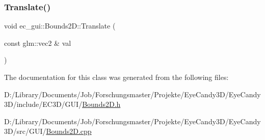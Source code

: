 \subsubsection{\texorpdfstring{Translate()}{Translate()}}
{\footnotesize\ttfamily void ec\+\_\+gui\+::\+Bounds2\+D\+::\+Translate (\begin{DoxyParamCaption}\item[{const glm\+::vec2 \&}]{val }\end{DoxyParamCaption})}



The documentation for this class was generated from the following files\+:\begin{DoxyCompactItemize}
\item 
D\+:/\+Library/\+Documents/\+Job/\+Forschungsmaster/\+Projekte/\+Eye\+Candy3\+D/\+Eye\+Candy3\+D/include/\+E\+C3\+D/\+G\+U\+I/\mbox{\hyperlink{_bounds2_d_8h}{Bounds2\+D.\+h}}\item 
D\+:/\+Library/\+Documents/\+Job/\+Forschungsmaster/\+Projekte/\+Eye\+Candy3\+D/\+Eye\+Candy3\+D/src/\+G\+U\+I/\mbox{\hyperlink{_bounds2_d_8cpp}{Bounds2\+D.\+cpp}}\end{DoxyCompactItemize}

